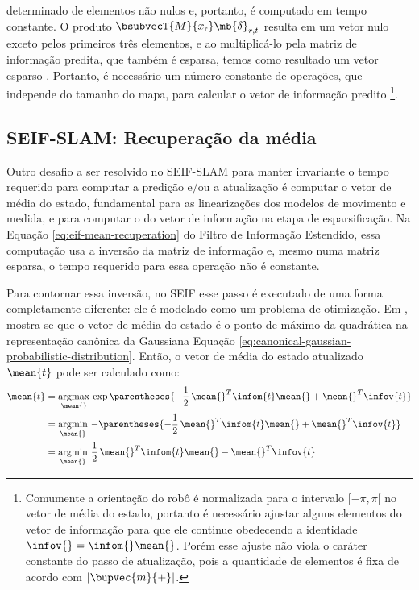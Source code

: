 determinado de elementos não nulos e, portanto, é computado em tempo 
constante. O produto $\bsubvecT{M}{x_\mathrm{r}} \mb{\delta}_{r,t}$ 
resulta em um vetor nulo exceto pelos primeiros três elementos, e ao 
multiplicá-lo pela matriz de informação predita, que também é esparsa, 
temos como resultado um vetor esparso 
\cite[p.~398]{thrun2005probabilistic}. Portanto, é necessário um número 
constante de operações, que independe do tamanho do mapa, para calcular o 
vetor de informação predito \footnote{Comumente a orientação do robô é 
normalizada para o intervalo $[-\pi, \pi[$ no vetor de média do estado, portanto é necessário 
ajustar alguns elementos do vetor de informação para que ele continue 
obedecendo a identidade $\infov{} = \infom{}\mean{}$. Porém esse ajuste não viola o caráter constante do passo de atualização, pois a quantidade de elementos é fixa de acordo com $\lvert \bupvec{m}{+} \rvert$.}.

\subsection{SEIF-SLAM: Recuperação da média}
\label{sec:seif-mean-recovery}
Outro desafio a ser resolvido no SEIF-SLAM para manter invariante o tempo requerido para computar a predição e/ou a atualização é computar o vetor de média do estado, 
fundamental para as linearizações dos modelos de movimento e medida, e para computar o do vetor de informação na etapa de esparsificação. Na Equação 
\ref{eq:eif-mean-recuperation} do Filtro de Informação Estendido, essa 
computação usa a inversão da matriz de informação 
e, mesmo numa matriz esparsa, o tempo requerido para essa operação não é constante.

Para contornar essa inversão, no SEIF esse passo é executado de uma forma completamente diferente: ele é modelado como um problema de otimização. Em 
\cite[Cap.~12.6]{thrun2005probabilistic}, mostra-se que o vetor de média do estado é o ponto de máximo da quadrática na representação canônica da Gaussiana 
Equação \ref{eq:canonical-gaussian-probabilistic-distribution}. Então, o 
vetor de média do estado atualizado $\mean{t}$ pode ser calculado como:
\begin{equation}
  \begin{aligned}
    \mean{t} &= \mathop{\mathrm{argmax}}\limits_{\mean{}} \,\exp\parentheses{-\frac{1}{2}\,\mean{}^T\infom{t}\mean{} 
    + \mean{}^T \infov{t}}\\
    &= \mathop{\mathrm{argmin}}\limits_{\mean{}}\, - \parentheses{-\frac{1}{2}\,\mean{}^T\infom{t}\mean{} 
    + \mean{}^T \infov{t}}\\
    &= \mathop{\mathrm{argmin}}\limits_{\mean{}}\, \frac{1}{2}\,\mean{}^T\infom{t}\mean{} 
    - \mean{}^T \infov{t}
  \end{aligned}
  \label{eq:seif-mean-recuperation}
\end{equation}

